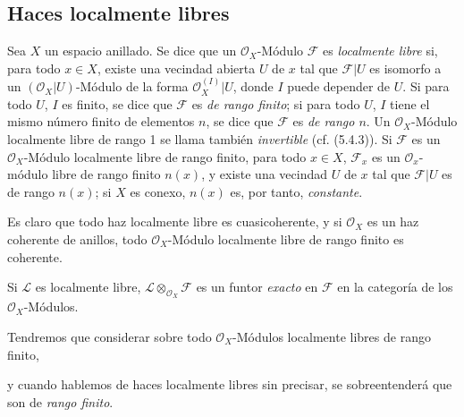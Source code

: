 \subsection{Haces localmente libres}
\label{subsection:0.5.4-fr}

\begin{env}[5.4.1]
\label{0.5.4.1-fr}
Sea $X$ un espacio anillado. Se dice que un $\mathcal{O}_X$-Módulo $\mathcal{F}$
es \emph{localmente libre} si, para todo $x\in X$, existe una vecindad
abierta $U$ de $x$ tal que $\mathcal{F}|U$ es isomorfo a un
$(\mathcal{O}_X|U)$-Módulo de la forma $\mathcal{O}_X^{(I)}|U$, donde $I$ puede
depender de $U$. Si para todo $U$, $I$ es finito, se dice que $\mathcal{F}$ es
\emph{de rango finito}; si para todo $U$, $I$ tiene el mismo número finito de elementos
$n$, se dice que $\mathcal{F}$ es \emph{de rango $n$}. Un
$\mathcal{O}_X$-Módulo localmente libre de rango 1 se llama también
\emph{invertible} (cf. (5.4.3)). Si $\mathcal{F}$ es un
$\mathcal{O}_X$-Módulo localmente libre de rango finito, para todo $x\in X$,
$\mathcal{F}_x$ es un $\mathcal{O}_x$-módulo libre de rango finito $n(x)$, y
existe una vecindad $U$ de $x$ tal que $\mathcal{F}|U$ es de rango $n(x)$;
si $X$ es conexo, $n(x)$ es, por tanto, \emph{constante}.

Es claro que todo haz localmente libre es cuasicoherente, y si
$\mathcal{O}_X$ es un haz coherente de anillos, todo
$\mathcal{O}_X$-Módulo localmente libre de rango finito es coherente.

Si $\mathcal{L}$ es localmente libre,
$\mathcal{L}\otimes_{\mathcal{O}_X}\mathcal{F}$ es un funtor \emph{exacto}
en $\mathcal{F}$ en la categoría de los $\mathcal{O}_X$-Módulos.

Tendremos que considerar sobre todo $\mathcal{O}_X$-Módulos localmente libres
de rango finito,


y cuando hablemos de haces localmente libres sin precisar, se
sobreentenderá que son de \emph{rango finito}.
\end{env}


